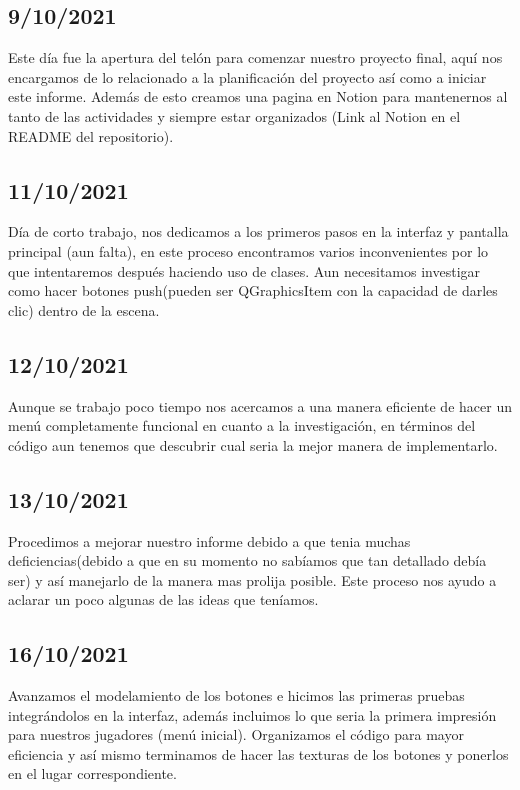 \documentclass{article}
\begin{document}
    \subsection{9/10/2021}
        Este día fue la apertura del telón para comenzar nuestro proyecto final, aquí nos encargamos de lo relacionado a la planificación del proyecto así como a iniciar este informe. Además de esto creamos una pagina en Notion para mantenernos al tanto de las actividades y siempre estar organizados (Link al Notion en el README del repositorio).
        
    \subsection{11/10/2021}
        Día de corto trabajo, nos dedicamos a los primeros pasos en la interfaz y pantalla principal (aun falta), en este proceso encontramos varios inconvenientes por lo que intentaremos después haciendo uso de clases. Aun necesitamos investigar como hacer botones push(pueden ser QGraphicsItem con la capacidad de darles clic) dentro de la escena.
        
    \subsection{12/10/2021}
        Aunque se trabajo poco tiempo nos acercamos a una manera eficiente de hacer un menú completamente funcional en cuanto a la investigación, en términos del código aun tenemos que descubrir cual seria la mejor manera de implementarlo.
        
    \subsection{13/10/2021}
        Procedimos a mejorar nuestro informe debido a que tenia muchas deficiencias(debido a que en su momento no sabíamos que tan detallado debía ser) y así manejarlo de la manera mas prolija posible. Este proceso nos ayudo a aclarar un poco algunas de las ideas que teníamos.
        
    \subsection{16/10/2021}
    Avanzamos el modelamiento de los botones e hicimos las primeras pruebas integrándolos en la interfaz, además incluimos lo que seria la primera impresión para nuestros jugadores (menú inicial). Organizamos el código para mayor eficiencia y así mismo terminamos de hacer las texturas de los botones y ponerlos en el lugar correspondiente.
    
\end{document}
